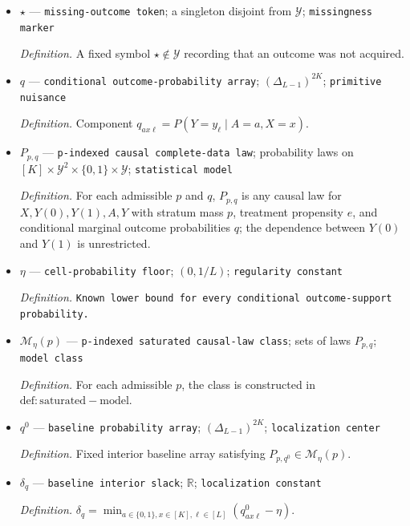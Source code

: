 \documentclass{article}
\begin{document}
\begin{itemize}
  \par\smallskip\noindent\emph{Definition.} Outcome satisfying \(Y=Y(A)\).
  \item \(\star\) --- \texttt{missing-\allowbreak{}outcome token}; a singleton disjoint from \(\mathcal Y\); \texttt{missingness marker}
  \par\smallskip\noindent\emph{Definition.} A fixed symbol \(\star\notin\mathcal Y\) recording that an outcome was not acquired.
  \item \(q\) --- \texttt{conditional outcome-\allowbreak{}probability array}; \((\Delta_{L-1})^{2K}\); \texttt{primitive nuisance}
  \par\smallskip\noindent\emph{Definition.} Component \(q_{ax\ell}=P(Y=y_\ell\mid A=a,X=x)\).
  \item \(P_{p,q}\) --- \texttt{p-\allowbreak{}indexed causal complete-\allowbreak{}data law}; probability laws on \([K]\times\mathcal Y^2\times\{0,1\}\times\mathcal Y\); \texttt{statistical model}
  \par\smallskip\noindent\emph{Definition.} For each admissible \(p\) and \(q\), \(P_{p,q}\) is any causal law for \(X,Y(0),Y(1),A,Y\) with stratum mass \(p\), treatment propensity \(e\), and conditional marginal outcome probabilities \(q\); the dependence between \(Y(0)\) and \(Y(1)\) is unrestricted.
  \item \(\eta\) --- \texttt{cell-\allowbreak{}probability floor}; \((0,1/L)\); \texttt{regularity constant}
  \par\smallskip\noindent\emph{Definition.} \texttt{Known lower bound for every conditional outcome-\allowbreak{}support probability.}
  \item \(\mathcal M_\eta(p)\) --- \texttt{p-\allowbreak{}indexed saturated causal-\allowbreak{}law class}; sets of laws \(P_{p,q}\); \texttt{model class}
  \par\smallskip\noindent\emph{Definition.} For each admissible \(p\), the class is constructed in \(\mathrm{def:saturated-model}\).
  \item \(q^0\) --- \texttt{baseline probability array}; \((\Delta_{L-1})^{2K}\); \texttt{localization center}
  \par\smallskip\noindent\emph{Definition.} Fixed interior baseline array satisfying \(P_{p,q^0}\in\mathcal M_\eta(p)\).
  \item \(\delta_q\) --- \texttt{baseline interior slack}; \(\mathbb R\); \texttt{localization constant}
  \par\smallskip\noindent\emph{Definition.} \(\delta_q=\min_{a\in\{0,1\},x\in[K],\ell\in[L]}(q^0_{ax\ell}-\eta)\).

\end{itemize}
\end{document}
